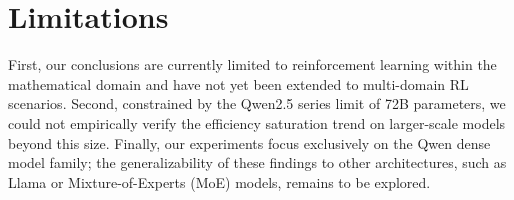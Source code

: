 \section*{Limitations}
First, our conclusions are currently limited to reinforcement learning within the mathematical domain and have not yet been extended to multi-domain RL scenarios. Second, constrained by the Qwen2.5 series limit of 72B parameters, we could not empirically verify the efficiency saturation trend on larger-scale models beyond this size. Finally, our experiments focus exclusively on the Qwen dense model family; the generalizability of these findings to other architectures, such as Llama or Mixture-of-Experts (MoE) models, remains to be explored.